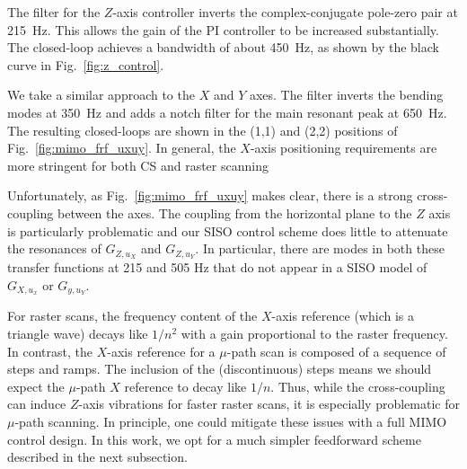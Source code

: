 \documentclass[twocolumn,oneside]{IEEEtran/IEEEtran}
\begin{document}
The filter for the $Z$-axis controller inverts the complex-conjugate pole-zero pair at 215~Hz. This allows the gain of the PI controller to be increased substantially. The closed-loop achieves a bandwidth of about 450~Hz, as shown by the black curve in Fig.~\ref{fig:z_control}.

We take a similar approach to the $X$ and $Y$ axes. The filter inverts the bending modes at 350~Hz and adds a notch filter for the main resonant peak at 650~Hz. The resulting closed-loops are shown in the (1,1) and (2,2) positions of Fig.~\ref{fig:mimo_frf_uxuy}. In general, the $X$-axis positioning requirements are more stringent for both CS and raster scanning

Unfortunately, as Fig.~\ref{fig:mimo_frf_uxuy} makes clear, there is a strong cross-coupling between the axes. The coupling from the horizontal plane to the $Z$ axis is particularly problematic and our SISO control scheme does little to attenuate the resonances of $G_{Z,u_X}$ and $G_{Z,u_Y}$. In particular, there are modes in both these transfer functions at 215 and 505 Hz that do not appear in a SISO model of $G_{X,u_x}$ or $G_{y,u_Y}$.

For raster scans, the frequency content of the $X$-axis reference (which is a triangle wave) decays like $1/n^2$ with a gain proportional to the raster frequency. In contrast, the $X$-axis reference for a $\mu$-path scan is composed of a sequence of steps and ramps. The inclusion of the (discontinuous) steps means we should expect the $\mu$-path $X$ reference to decay like $1/n$. 
Thus,  while the cross-coupling can induce $Z$-axis vibrations for faster raster scans, it is especially problematic for $\mu$-path scanning. In principle, one could mitigate these issues with a full MIMO control design. In this work, we opt for a much simpler feedforward scheme described in the next subsection.

% 
\end{document}
